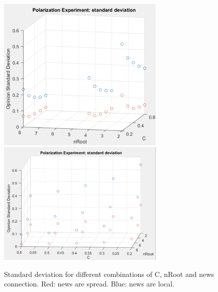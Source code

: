 \begin{figure}[!t]
\centering
\includegraphics[width=8cm]{Figures/pol_std1.png}
\includegraphics[width=8cm]{Figures/pol_std2.png}
\caption{Standard deviation for different combinations of C, nRoot and news connection. Red: news are spread. Blue: news are local.}
\label{pics:pol_std}
\end{figure}










